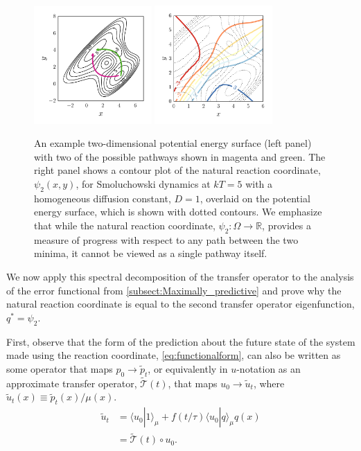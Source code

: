 \documentclass[aip, jcp, reprint, nolinenumbers, twocolumn, nobalancelastpage, nofootinbib]{revtex4-1}
\begin{document}
\begin{figure}
    \centering
    \includegraphics[width=0.4\textwidth]{2d-potential-crop.pdf}
    \includegraphics[width=0.4\textwidth]{2d-potential-psi2-crop.pdf}
    \caption{\label{fig:2dexample}
An example two-dimensional potential energy surface (left panel) with two of the possible pathways shown in magenta and green. The right panel shows a contour plot of the natural reaction coordinate, $\psi_2(x,y)$, for Smoluchowski dynamics at $kT=5$ with a homogeneous diffusion constant, $D=1$, overlaid on the potential energy surface, which is shown with dotted contours. We emphasize that while the natural reaction coordinate, $\psi_2 : \Omega \rightarrow \mathbb{R}$, provides a measure of progress with respect to any path between the two minima, it cannot be viewed as a single pathway itself.}
\end{figure}

\label{subsect:Analysis_of_the_error_functional}
We now apply this spectral decomposition of the transfer operator to the analysis of the error functional from \cref{subsect:Maximally_predictive} and prove why the natural reaction coordinate is equal to the second transfer operator eigenfunction, $q^* = \psi_2$.


First, observe that the form of the prediction about the future state of the system made using the reaction coordinate, \cref{eq:functionalform}, can also be written as some operator that maps $p_0 \rightarrow \tilde{p}_t$, or equivalently in $u$-notation as an approximate transfer operator, $\tilde{\mathcal{T}}(t)$, that maps $u_0 \rightarrow  \tilde{u}_t$, where $\tilde{u}_t(x) \equiv \tilde{p}_t(x)/\mu(x)$.
\begin{align}
    \tilde{u}_t &= \langle u_0 | 1 \rangle_\mu + f(t/\tau) \langle u_0 | q \rangle_\mu q(x) \label{eq:predict_u}\\
    &= \tilde{\mathcal{T}}(t) \circ u_0.
\end{align}
\end{document}
